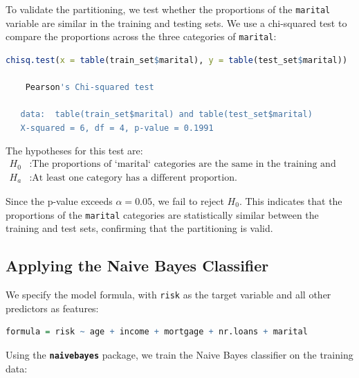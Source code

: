 \documentclass[
]{book}
\newcommand{\passthrough}[1]{#1}
\theoremstyle{definition}
\theoremstyle{definition}
\theoremstyle{definition}
\theoremstyle{definition}
\theoremstyle{remark}
\begin{document}
To validate the partitioning, we test whether the proportions of the \passthrough{\lstinline!marital!} variable are similar in the training and testing sets. We use a chi-squared test to compare the proportions across the three categories of \passthrough{\lstinline!marital!}:

\begin{lstlisting}[language=R]
chisq.test(x = table(train_set$marital), y = table(test_set$marital))
   
    Pearson's Chi-squared test
   
   data:  table(train_set$marital) and table(test_set$marital)
   X-squared = 6, df = 4, p-value = 0.1991
\end{lstlisting}

The hypotheses for this test are:\\
\[
\begin{aligned}
H_0 &: \text{The proportions of `marital` categories are the same in the training and test sets.} \\
H_a &: \text{At least one category has a different proportion.}
\end{aligned}
\]

Since the p-value exceeds \(\alpha = 0.05\), we fail to reject \(H_0\). This indicates that the proportions of the \passthrough{\lstinline!marital!} categories are statistically similar between the training and test sets, confirming that the partitioning is valid.

\subsection*{Applying the Naive Bayes Classifier}\label{applying-the-naive-bayes-classifier}

We specify the model formula, with \passthrough{\lstinline!risk!} as the target variable and all other predictors as features:

\begin{lstlisting}[language=R]
formula = risk ~ age + income + mortgage + nr.loans + marital
\end{lstlisting}

Using the \textbf{\passthrough{\lstinline!naivebayes!}} package, we train the Naive Bayes classifier on the training data:
\end{document}
